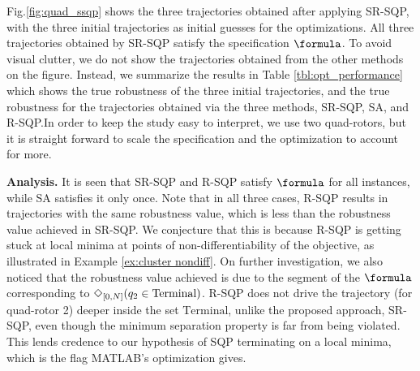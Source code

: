Fig.\ref{fig:quad_ssqp} shows the three trajectories obtained after applying SR-SQP,
with the three initial trajectories as initial guesses for the optimizations. 
All three trajectories obtained by SR-SQP satisfy the specification $\formula$. 
To avoid visual clutter, we do not show the trajectories obtained from the other methods on the figure.
Instead, we summarize the results in Table \ref{tbl:opt_performance} which shows the true robustness of the three initial trajectories, and the true robustness for the trajectories obtained via the three methods, SR-SQP, SA, and R-SQP.In order to keep the study easy to interpret, we use two quad-rotors, but it is straight forward to scale the specification and the optimization to account for more. 


\textbf{Analysis.} It is seen that SR-SQP and R-SQP satisfy $\formula$ for all instances, while SA satisfies it only once.
Note that in all three cases, R-SQP results in trajectories with the same robustness value, which is less than the robustness value achieved in SR-SQP.
We conjecture that this is because R-SQP is getting stuck at local minima at points of non-differentiability of the objective, as illustrated in Example \ref{ex:cluster nondiff}.
On further investigation, we also noticed that the robustness value achieved is due to the segment of the $\formula$ corresponding to $\Diamond_{[0,N]}(q_2 \in \text{Terminal})$. R-SQP does not drive the trajectory (for quad-rotor 2) deeper inside the set $\text{Terminal}$, unlike the proposed approach, SR-SQP, even though the minimum separation property is far from being violated. This lends credence to our hypothesis of SQP terminating on a local minima, which is the flag MATLAB's optimization gives.

